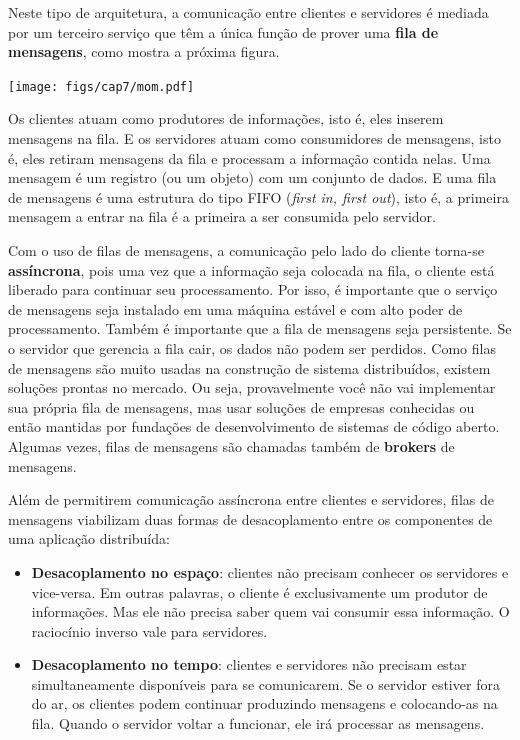 \documentclass[
  11pt,
  twoside]{book}
\let\origfigure\figure
\let\endorigfigure\endfigure
\renewenvironment{figure}[1][2] {
    \expandafter\origfigure\expandafter[!h]
} {
    \endorigfigure
}
\begin{document}

Neste tipo de arquitetura, a comunicação entre clientes e servidores é
mediada por um terceiro serviço que têm a única função de prover uma
\textbf{fila de mensagens}, como mostra a próxima figura.

\begin{figure}
\centering
\texttt{[image: figs/cap7/mom.pdf]}
\caption{Arquitetura Orientada a Mensagens}
\end{figure}

Os clientes atuam como produtores de informações, isto é, eles inserem
mensagens na fila. E os servidores atuam como consumidores de mensagens,
isto é, eles retiram mensagens da fila e processam a informação contida
nelas. Uma mensagem é um registro (ou um objeto) com um conjunto de
dados. E uma fila de mensagens é uma estrutura do tipo FIFO (\emph{first
in, first out}), isto é, a primeira mensagem a entrar na fila é a
primeira a ser consumida pelo servidor.

Com o uso de filas de mensagens, a comunicação pelo lado do cliente
torna-se \textbf{assíncrona}, pois uma vez que a informação seja
colocada na fila, o cliente está liberado para continuar seu
processamento. Por isso, é importante que o serviço de mensagens seja
instalado em uma máquina estável e com alto poder de processamento.
Também é importante que a fila de mensagens seja persistente. Se o
servidor que gerencia a fila cair, os dados não podem ser perdidos. Como
filas de mensagens são muito usadas na construção de sistema
distribuídos, existem soluções prontas no mercado. Ou seja,
provavelmente você não vai implementar sua própria fila de mensagens,
mas usar soluções de empresas conhecidas ou então mantidas por fundações
de desenvolvimento de sistemas de código aberto. Algumas vezes, filas de
mensagens são chamadas também de \textbf{brokers} de mensagens.

Além de permitirem comunicação assíncrona entre clientes e servidores,
filas de mensagens viabilizam duas formas de desacoplamento entre os
componentes de uma aplicação distribuída:

\begin{itemize}
\item
  \textbf{Desacoplamento no espaço}:
  clientes não precisam conhecer os servidores e vice-versa. Em outras
  palavras, o cliente é exclusivamente um produtor de informações. Mas
  ele não precisa saber quem vai consumir essa informação. O raciocínio
  inverso vale para servidores.
\item
  \textbf{Desacoplamento no tempo}:
  clientes e servidores não precisam estar simultaneamente disponíveis
  para se comunicarem. Se o servidor estiver fora do ar, os clientes
  podem continuar produzindo mensagens e colocando-as na fila. Quando o
  servidor voltar a funcionar, ele irá processar as mensagens.
\end{itemize}
\end{document}
